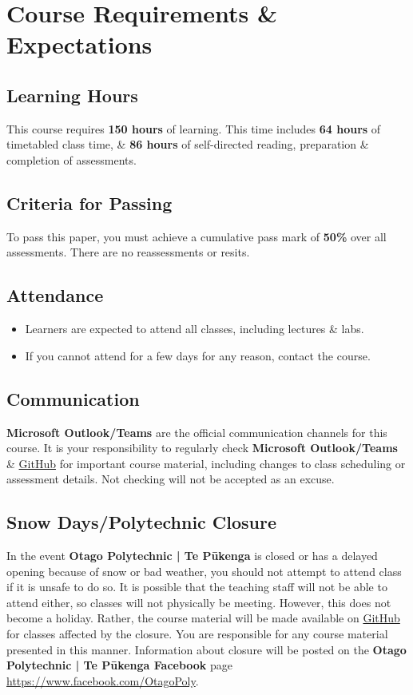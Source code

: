 \documentclass{article}
\begin{document}
\section*{Course Requirements \& Expectations}

\subsection*{Learning Hours}
This course requires \textbf{150 hours} of learning. This time includes \textbf{64 hours} of timetabled class time, \& \textbf{86 hours} of self-directed reading, preparation \& completion of assessments.  

\subsection*{Criteria for Passing}
To pass this paper, you must achieve a cumulative pass mark of \textbf{50\%} over all assessments. There are no reassessments or resits.

\subsection*{Attendance}
\begin{itemize}
	\item Learners are expected to attend all classes, including lectures \& labs.
	\item If you cannot attend for a few days for any reason, contact the course.
\end{itemize}

\subsection*{Communication}
\textbf{Microsoft Outlook/Teams} are the official communication channels for this course. It is your responsibility to regularly check \textbf{Microsoft Outlook/Teams} \& \href{https://github.com/otago-polytechnic-bit-courses/ID608001-intermediate-app-dev-concepts}{GitHub} for important course material, including changes to class scheduling or assessment details. Not checking will not be accepted as an excuse.

\subsection*{Snow Days/Polytechnic Closure}
In the event \textbf{Otago Polytechnic | Te Pūkenga} is closed or has a delayed opening because of snow or bad weather, you should not attempt to attend class if it is unsafe to do so. It is possible that the teaching staff will not be able to attend either, so classes will not physically be meeting. However, this does not become a holiday. Rather, the course material will be made available on \href{https://github.com/otago-polytechnic-bit-courses/ID607001-intro-app-dev-concepts}{GitHub} for classes affected by the closure. You are responsible for any course material presented in this manner. Information about closure will be posted on the \textbf{Otago Polytechnic | Te Pūkenga Facebook} page \href{https://www.facebook.com/OtagoPoly}{https://www.facebook.com/OtagoPoly}.
\end{document}
